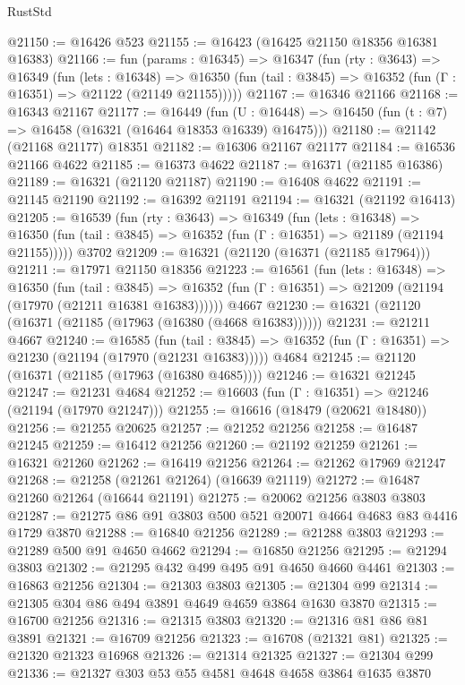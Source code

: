 \begin{lexlean}{RustStd}
\begin{coremodule}
@21150 := @16426 @523
@21155 := @16423 (@16425 @21150 @18356 @16381 @16383)
@21166 := fun (params : @16345) =>
  @16347
    (fun (rty : @3643) =>
    @16349
      (fun (lets : @16348) =>
      @16350 (fun (tail : @3845) => @16352 (fun (Γ : @16351) => @21122 (@21149 @21155)))))
@21167 := @16346 @21166
@21168 := @16343 @21167
@21177 := @16449
    (fun (U : @16448) => @16450 (fun (t : @7) => @16458 (@16321 (@16464 @18353 @16339) @16475)))
@21180 := @21142 (@21168 @21177) @18351
@21182 := @16306 @21167 @21177
@21184 := @16536 @21166 @4622
@21185 := @16373 @4622
@21187 := @16371 (@21185 @16386)
@21189 := @16321 (@21120 @21187)
@21190 := @16408 @4622
@21191 := @21145 @21190
@21192 := @16392 @21191
@21194 := @16321 (@21192 @16413)
@21205 := @16539
    (fun (rty : @3643) =>
    @16349
      (fun (lets : @16348) =>
      @16350 (fun (tail : @3845) => @16352 (fun (Γ : @16351) => @21189 (@21194 @21155)))))
    @3702
@21209 := @16321 (@21120 (@16371 (@21185 @17964)))
@21211 := @17971 @21150 @18356
@21223 := @16561
    (fun (lets : @16348) =>
    @16350
      (fun (tail : @3845) =>
      @16352 (fun (Γ : @16351) => @21209 (@21194 (@17970 (@21211 @16381 @16383))))))
    @4667
@21230 := @16321 (@21120 (@16371 (@21185 (@17963 (@16380 (@4668 @16383))))))
@21231 := @21211 @4667
@21240 := @16585
    (fun (tail : @3845) => @16352 (fun (Γ : @16351) => @21230 (@21194 (@17970 (@21231 @16383)))))
    @4684
@21245 := @21120 (@16371 (@21185 (@17963 (@16380 @4685))))
@21246 := @16321 @21245
@21247 := @21231 @4684
@21252 := @16603 (fun (Γ : @16351) => @21246 (@21194 (@17970 @21247)))
@21255 := @16616 (@18479 (@20621 @18480))
@21256 := @21255 @20625
@21257 := @21252 @21256
@21258 := @16487 @21245
@21259 := @16412 @21256
@21260 := @21192 @21259
@21261 := @16321 @21260
@21262 := @16419 @21256
@21264 := @21262 @17969 @21247
@21268 := @21258 (@21261 @21264) (@16639 @21119)
@21272 := @16487 @21260 @21264 (@16644 @21191)
@21275 := @20062 @21256 @3803 @3803
@21287 := @21275 @86 @91 @3803 @500 @521 @20071 @4664 @4683 @83 @4416 @1729 @3870
@21288 := @16840 @21256
@21289 := @21288 @3803
@21293 := @21289 @500 @91 @4650 @4662
@21294 := @16850 @21256
@21295 := @21294 @3803
@21302 := @21295 @432 @499 @495 @91 @4650 @4660 @4461
@21303 := @16863 @21256
@21304 := @21303 @3803
@21305 := @21304 @99
@21314 := @21305 @304 @86 @494 @3891 @4649 @4659 @3864 @1630 @3870
@21315 := @16700 @21256
@21316 := @21315 @3803
@21320 := @21316 @81 @86 @81 @3891
@21321 := @16709 @21256
@21323 := @16708 (@21321 @81)
@21325 := @21320 @21323 @16968
@21326 := @21314 @21325
@21327 := @21304 @299
@21336 := @21327 @303 @53 @55 @4581 @4648 @4658 @3864 @1635 @3870

\end{coremodule}
\end{lexlean}
